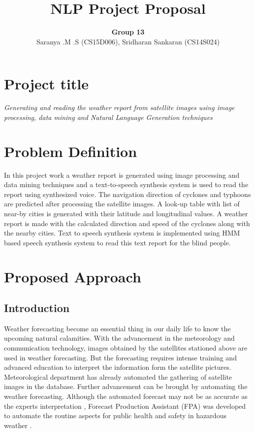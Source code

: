 \documentclass{article}
\title{NLP Project Proposal}
\author{ {\bf Group 13} \\ Saranya .M .S (CS15D006), Sridharan Sankaran (CS14S024)}
\begin{document}
\maketitle

\section*{Project title}
{ \textit {Generating and reading the weather report from satellite images using image processing, data mining and Natural Language Generation techniques }}

\section*{Problem Definition}

In this project work a weather report is generated using image processing and data mining techniques 
and a text-to-speech synthesis system is used to read the report using synthesized 
voice. The navigation direction of cyclones and typhoons are predicted after processing
the satellite images. A look-up table with  list of near-by cities is generated with
their latitude and longitudinal values. A weather report is made with the calculated direction and speed of the cyclones along with the nearby cities. Text to speech
synthesis system is implemented using HMM based speech synthesis system to read this
text report for the blind people. 

\section{Proposed Approach}

\subsection{Introduction}
\label{sec:intro}
Weather forecasting become an essential thing in our daily life to know the upcoming 
natural calamities. With the advancement in the meteorology and communication 
technology, images obtained by the satellites stationed above are used in weather
forecasting. But the forecasting requires intense training and advanced education to 
interpret the information form the satellite pictures. Meteorological department has already
automated the gathering of satellite images in the database. Further advancement can be
brought by automating the weather forecasting. Although the automated forecast may not
be as accurate as the experts interpretation \cite{weatherReport}, Forecast Production Assistant (FPA) was 
developed to automate the routine aspects for public health and safety in hazardous
 weather \cite{fpa}. 
\end{document}
